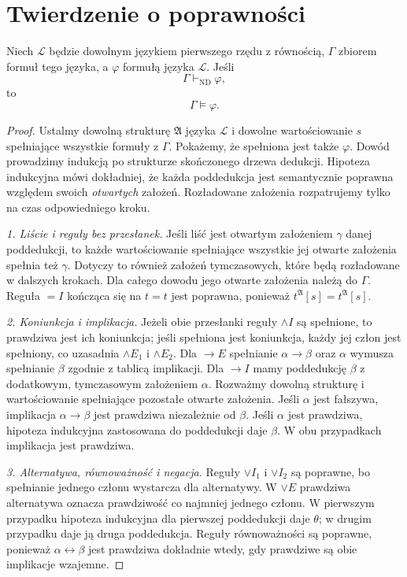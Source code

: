 \section{Twierdzenie o poprawności}
\begin{twierdzenie}
\label{thm:soundness}
Niech $\mathcal L$ będzie dowolnym językiem pierwszego rzędu
z równością, $\Gamma$ zbiorem formuł tego języka,
a $\varphi$ formułą języka $\mathcal L$. Jeśli
\[
\Gamma\vdash_{\mathrm{ND}}\varphi,
\]
to
\[
\Gamma\models\varphi.
\]
\end{twierdzenie}
\begin{proof}
Ustalmy dowolną strukturę $\mathfrak A$ języka $\mathcal L$
i dowolne wartościowanie $s$ spełniające wszystkie
formuły z $\Gamma$. Pokażemy, że spełniona jest także $\varphi$.
Dowód prowadzimy indukcją po strukturze skończonego drzewa dedukcji.
Hipoteza indukcyjna mówi dokładniej, że każda poddedukcja
jest semantycznie poprawna względem swoich \emph{otwartych}
założeń. Rozładowane założenia rozpatrujemy tylko na czas
odpowiedniego kroku.

\smallskip
\emph{1. Liście i reguły bez przesłanek.}
Jeśli liść jest otwartym założeniem $\gamma$
danej poddedukcji, to każde wartościowanie
spełniające wszystkie jej otwarte założenia spełnia też
$\gamma$. Dotyczy to również założeń tymczasowych,
które będą rozładowane w dalszych krokach.
Dla całego dowodu jego otwarte założenia należą do $\Gamma$.
Reguła $=I$ kończąca się na $t=t$ jest poprawna,
ponieważ $t^{\mathfrak A}[s]=t^{\mathfrak A}[s]$.

\smallskip
\emph{2. Koniunkcja i implikacja.}
Jeżeli obie przesłanki reguły $\land I$ są spełnione,
to prawdziwa jest ich koniunkcja; jeśli spełniona jest
koniunkcja, każdy jej człon jest spełniony, co uzasadnia
$\land E_1$ i $\land E_2$.
Dla $\to E$ spełnianie $\alpha\to\beta$ oraz $\alpha$
wymusza spełnianie $\beta$ zgodnie z tablicą implikacji.
Dla $\to I$ mamy poddedukcję $\beta$ z dodatkowym,
tymczasowym założeniem $\alpha$. Rozważmy dowolną
strukturę i wartościowanie spełniające pozostałe otwarte
założenia. Jeśli $\alpha$ jest fałszywa, implikacja
$\alpha\to\beta$ jest prawdziwa niezależnie od $\beta$.
Jeśli $\alpha$ jest prawdziwa, hipoteza indukcyjna
zastosowana do poddedukcji daje $\beta$.
W obu przypadkach implikacja jest prawdziwa.

\smallskip
\emph{3. Alternatywa, równoważność i negacja.}
Reguły $\lor I_1$ i $\lor I_2$ są poprawne, bo
spełnianie jednego członu wystarcza dla alternatywy.
W $\lor E$ prawdziwa alternatywa oznacza prawdziwość
co najmniej jednego członu. W pierwszym przypadku
hipoteza indukcyjna dla pierwszej poddedukcji daje $\theta$;
w drugim przypadku daje ją druga poddedukcja.
Reguły równoważności są poprawne, ponieważ
$\alpha\leftrightarrow\beta$ jest prawdziwa dokładnie wtedy,
gdy prawdziwe są obie implikacje wzajemne.


\end{proof}

